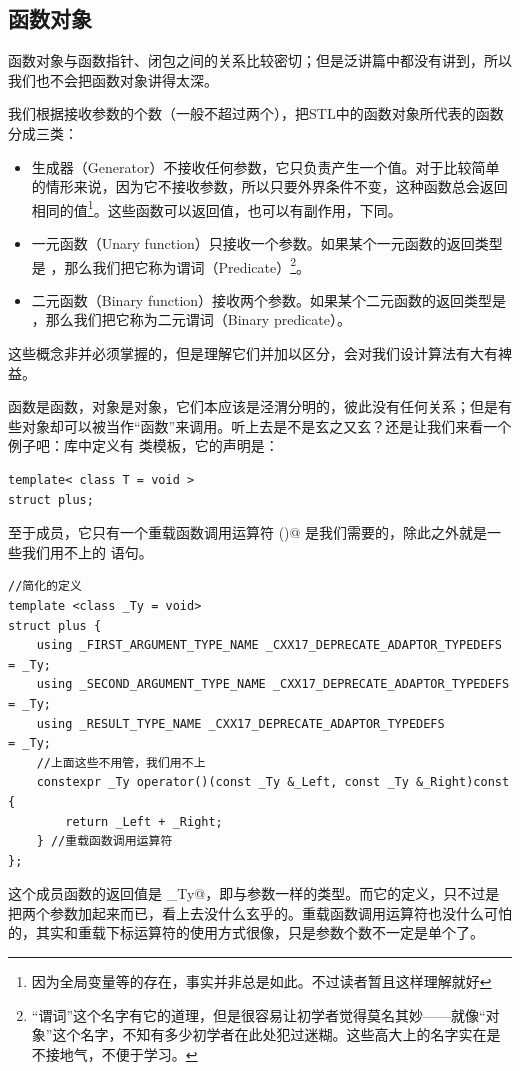 \subsection*{函数对象}
函数对象与函数指针、闭包之间的关系比较密切；但是泛讲篇中都没有讲到，所以我们也不会把函数对象讲得太深。\par
我们根据接收参数的个数（一般不超过两个），把STL中的函数对象所代表的函数分成三类：
\begin{itemize}
    \item 生成器（Generator）不接收任何参数，它只负责产生一个值。对于比较简单的情形来说，因为它不接收参数，所以只要外界条件不变，这种函数总会返回相同的值\footnote{因为全局变量等的存在，事实并非总是如此。不过读者暂且这样理解就好}。这些函数可以返回值，也可以有副作用，下同。
    \item 一元函数（Unary function）只接收一个参数。如果某个一元函数的返回类型是 \lstinline@bool@，那么我们把它称为谓词（Predicate）\footnote{``谓词''这个名字有它的道理，但是很容易让初学者觉得莫名其妙——就像``对象''这个名字，不知有多少初学者在此处犯过迷糊。这些高大上的名字实在是不接地气，不便于学习。}。
    \item 二元函数（Binary function）接收两个参数。如果某个二元函数的返回类型是 \lstinline@bool@，那么我们把它称为二元谓词（Binary predicate）。
\end{itemize}
这些概念非并必须掌握的，但是理解它们并加以区分，会对我们设计算法有大有裨益。\par
函数是函数，对象是对象，它们本应该是泾渭分明的，彼此没有任何关系；但是有些对象却可以被当作``函数''来调用。听上去是不是玄之又玄？还是让我们来看一个例子吧：\lstinline@functional@ 库中定义有 \lstinline@plus@ 类模板，它的声明是：
\begin{lstlisting}
template< class T = void >
struct plus;
\end{lstlisting}
至于成员，它只有一个重载函数调用运算符 \lstinline@()@ 是我们需要的，除此之外就是一些我们用不上的 \lstinline@using@ 语句。
\begin{lstlisting}
//简化的定义
template <class _Ty = void>
struct plus {
    using _FIRST_ARGUMENT_TYPE_NAME _CXX17_DEPRECATE_ADAPTOR_TYPEDEFS  = _Ty;
    using _SECOND_ARGUMENT_TYPE_NAME _CXX17_DEPRECATE_ADAPTOR_TYPEDEFS = _Ty;
    using _RESULT_TYPE_NAME _CXX17_DEPRECATE_ADAPTOR_TYPEDEFS          = _Ty;
    //上面这些不用管，我们用不上
    constexpr _Ty operator()(const _Ty &_Left, const _Ty &_Right)const {
        return _Left + _Right;
    } //重载函数调用运算符
};
\end{lstlisting}
这个成员函数的返回值是 \lstinline@_Ty@，即与参数一样的类型。而它的定义，只不过是把两个参数加起来而已，看上去没什么玄乎的。重载函数调用运算符也没什么可怕的，其实和重载下标运算符的使用方式很像，只是参数个数不一定是单个了。
